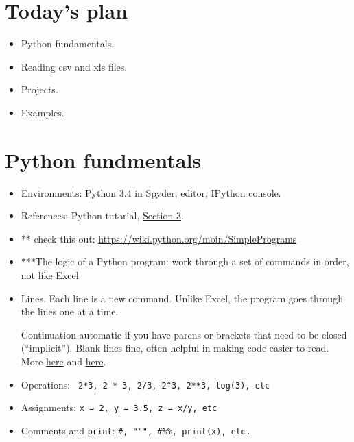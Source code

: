 \documentclass[11pt]{article}
\begin{document}
\section{Today's plan}

\begin{itemize}
\item Python fundamentals.
\item Reading csv and xls files.
\item Projects.
\item Examples.
\end{itemize}

\section{Python fundmentals}

\begin{itemize}
\item Environments:  Python 3.4 in Spyder, editor, IPython console.
\item References:
 {Python tutorial},
\href{https://docs.python.org/3.4/tutorial/introduction.html}{Section 3}.

\item ** check this out:  \url{https://wiki.python.org/moin/SimplePrograms} \\


\item ***The logic of a Python program:
work through a set of commands in order, not like Excel

\item Lines.  Each line is a new command. 
Unlike Excel, the program goes through the lines one at a time.  

Continuation automatic if you have parens or brackets that need to be closed (``implicit'').
Blank lines fine, often helpful in making code easier to read.
More
\href{https://docs.python.org/3.4/reference/lexical_analysis.html#line-structure}{here}
and \href{http://stackoverflow.com/questions/53162/how-can-i-do-a-line-break-line-continuation-in-python}
{here}.

\item Operations:  \verb: 2*3, 2 * 3, 2/3, 2^3, 2**3, log(3), etc :

\item Assignments:  {\tt x = 2, y = 3.5, z = x/y, etc }
\item Comments and {\tt print}:  \verb:#, """, #%%, print(x), etc. :


\end{itemize}
\end{document}
